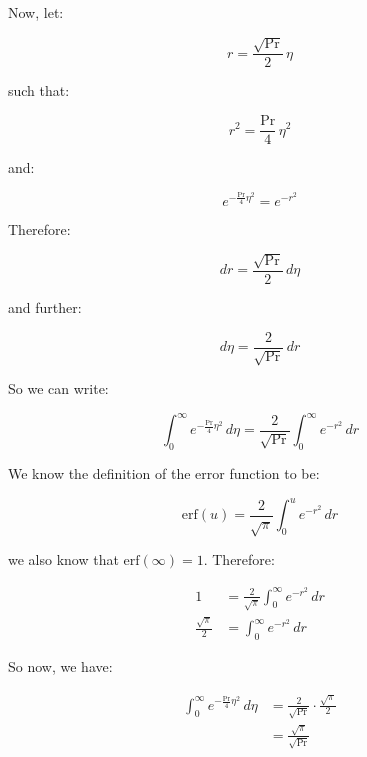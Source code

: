 \documentclass[letterpaper,12pt]{article}
\begin{document}
Now, let:

\begin{equation}
    r=\frac{\sqrt{\text{Pr}}}{2}\,\eta
\end{equation}

such that:

\begin{equation}
    r^2=\frac{\text{Pr}}{4}\,\eta^2
\end{equation}

and:

\begin{equation}
    e^{-\frac{\text{Pr}}{4}\eta^2}=e^{-r^2}
\end{equation}

Therefore:

\begin{equation}
    dr=\frac{\sqrt{\text{Pr}}}{2}\,d\eta
\end{equation}

and further:

\begin{equation}
    d\eta=\frac{2}{\sqrt{\text{Pr}}}\,dr
\end{equation}

So we can write:

\begin{equation}
    \int_0^\infty e^{-\frac{\text{Pr}}{4}\eta^2}\,d\eta=\frac{2}{\sqrt{\text{Pr}}}\int_0^\infty e^{-r^2}\,dr
\end{equation}

We know the definition of the error function to be:

\begin{equation}
    \text{erf}(u)=\frac{2}{\sqrt{\pi}}\int_0^u e^{-r^2}\,dr
\end{equation}

we also know that $\text{erf}(\infty)=1$. Therefore:

\begin{equation}
\begin{aligned}
        1                          &= \frac{2}{\sqrt{\pi}}\int_0^\infty e^{-r^2}\,dr \\
        \frac{\sqrt{\pi}}{2}       &= \int_0^\infty e^{-r^2}\,dr 
\end{aligned}
\end{equation}

So now, we have:

\begin{equation}
\begin{aligned}
    \int_0^\infty e^{-\frac{\text{Pr}}{4}\eta^2}\,d\eta &= \frac{2}{\sqrt{\text{Pr}}}\cdot\frac{\sqrt{\pi}}{2} \\
                                                        &= \frac{\sqrt{\pi}}{\sqrt{\text{Pr}}}
\end{aligned}
\end{equation}
\end{document}
